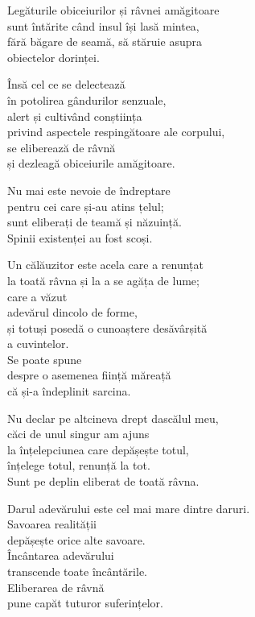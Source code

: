 Legăturile obiceiurilor și râvnei amăgitoare\\
sunt întărite când insul își lasă mintea,\\
fără băgare de seamă, să stăruie asupra\\
obiectelor dorinței.


Însă cel ce se delectează\\
în potolirea gândurilor senzuale,\\
alert și cultivând conștiința\\
privind aspectele respingătoare ale corpului,\\
se eliberează de râvnă\\
și dezleagă obiceiurile amăgitoare.


Nu mai este nevoie de îndreptare\\
pentru cei care și-au atins țelul;\\
sunt eliberați de teamă și năzuință.\\
Spinii existenței au fost scoși.


Un călăuzitor este acela care a renunțat\\
la toată râvna și la a se agăța de lume;\\
care a văzut\\
adevărul dincolo de forme,\\
și totuși posedă o cunoaștere desăvârșită\\
a cuvintelor.\\
Se poate spune\\
despre o asemenea ființă măreață\\
că și-a îndeplinit sarcina.


Nu declar pe altcineva drept dascălul meu,\\
căci de unul singur am ajuns\\
la înțelepciunea care depășește totul,\\
înțelege totul, renunță la tot.\\
Sunt pe deplin eliberat de toată râvna.


Darul adevărului este cel mai mare dintre daruri.\\
Savoarea realității\\
depășește orice alte savoare.\\
Încântarea adevărului\\
transcende toate încântările.\\
Eliberarea de râvnă\\
pune capăt tuturor suferințelor.


